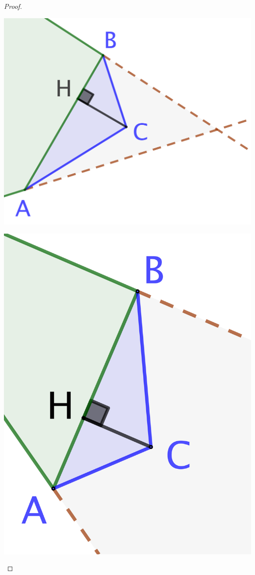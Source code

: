 \begin{proof}
\begin{enumerate}
\begin{multicols}{2}
			\includegraphics[scale=.4]{content/polygon/necessary-cond/add-vertex-1.png}

			\includegraphics[scale=.4]{content/polygon/necessary-cond/add-vertex-2.png}
		\end{multicols}


\end{enumerate}
\end{proof}

